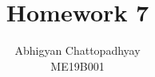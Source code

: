 \documentclass[12pt,a4paper]{article}
\title{Homework 7}
\author{Abhigyan Chattopadhyay\\
ME19B001}
\begin{document}
\maketitle
\pagebreak
\end{document}
